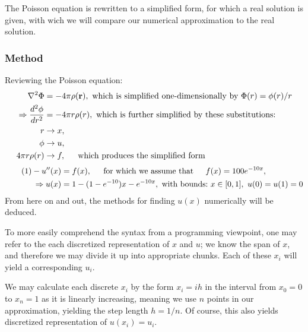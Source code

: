 \documentclass[11pt,a4paper,notitlepage]{article}
\begin{document}
The Poisson equation is rewritten to a simplified form, for which a real solution is given, with wich we will compare our numerical approximation to the real solution.

\subsubsection{Method}
Reviewing the Poisson equation:
\begin{align*}
\nabla ^2 \Phi &= -4\pi\rho(\mathbf{r}), \ \text{which is simplified one-dimensionally by} \ \Phi(r) = \phi(r)/r \\
\Rightarrow \frac{d^2 \phi}{dr^2} &= -4\pi r \rho(r), \ \text{which is further simplified by these substitutions:}\\
r &\rightarrow x, \\
\phi &\rightarrow u,\\
4\pi r\rho(r) &\rightarrow f, \indent \text{which produces the simplified form}
\end{align*}\begin{align*}\label{eq:1}\tag{1}
-u''(x) &= f(x), \indent \text{for which we assume that} \indent f(x) = 100e^{-10x}, \\
\Rightarrow u(x) &= 1- (1-e^{-10})x - e^{-10x},\ \text{with bounds:}\ x \in [0,1],\ u(0) = u(1)= 0
\end{align*}
From here on and out, the methods for finding $u(x)$ numerically will be deduced.

To more easily comprehend the syntax from a programming viewpoint, one may refer to the each discretized representation of $x$ and $u$; we know the span of $x$, and therefore we may divide it up into appropriate chunks. Each of these $x_i$ will yield a corresponding $u_i$.

We may calculate each discrete $x_i$ by the form $x_i = ih$ in the interval from $x_0 = 0$ to $x_{n} = 1$ as it is linearly increasing, meaning we use $n$ points in our approximation, yielding the step length $h = 1/n$. Of course, this also yields discretized representation of $u(x_i) = u_i$.
\end{document}

